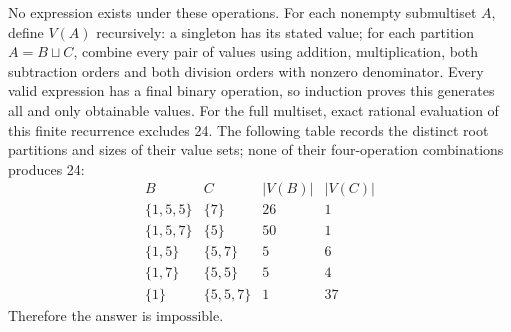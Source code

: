 No expression exists under these operations. For each nonempty submultiset $A$, define $V(A)$ recursively: a singleton has its stated value; for each partition $A=B\sqcup C$, combine every pair of values using addition, multiplication, both subtraction orders and both division orders with nonzero denominator. Every valid expression has a final binary operation, so induction proves this generates all and only obtainable values. For the full multiset, exact rational evaluation of this finite recurrence excludes 24. The following table records the distinct root partitions and sizes of their value sets; none of their four-operation combinations produces 24: \[\begin{array}{c|c|r|r}B&C&|V(B)|&|V(C)|\\\hline\{1,5,5\}&\{7\}&26&1\\\{1,5,7\}&\{5\}&50&1\\\{1,5\}&\{5,7\}&5&6\\\{1,7\}&\{5,5\}&5&4\\\{1\}&\{5,5,7\}&1&37\end{array}\] Therefore the answer is $\boxed{\text{impossible}}$.
